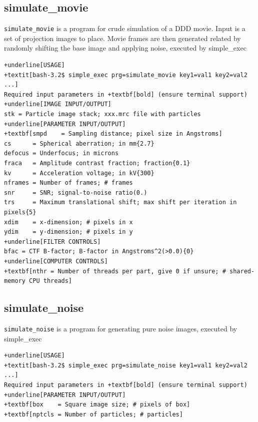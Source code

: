 \documentclass[a4paper,11pt]{article}
\newcommand{\prgname}[1]{\textcolor{NavyBlue}{\texttt{#1}}}
\begin{document}
\subsection{simulate\_movie}
\label{simulate_movie}
\prgname{simulate\_movie} is a program for crude simulation of a DDD movie. Input is a set of projection images to place. Movie frames are then generated related by randomly shifting the base image and applying noise, executed by simple\_exec
\begin{Verbatim}[commandchars=+\[\],fontsize=\small,breaklines=true]
+underline[USAGE]
+textit[bash-3.2$ simple_exec prg=simulate_movie key1=val1 key2=val2 ...]
Required input parameters in +textbf[bold] (ensure terminal support)
+underline[IMAGE INPUT/OUTPUT]
stk = Particle image stack; xxx.mrc file with particles
+underline[PARAMETER INPUT/OUTPUT]
+textbf[smpd    = Sampling distance; pixel size in Angstroms]
cs      = Spherical aberration; in mm{2.7}
defocus = Underfocus; in microns
fraca   = Amplitude contrast fraction; fraction{0.1}
kv      = Acceleration voltage; in kV{300}
nframes = Number of frames; # frames
snr     = SNR; signal-to-noise ratio(0.)
trs     = Maximum translational shift; max shift per iteration in pixels{5}
xdim    = x-dimension; # pixels in x
ydim    = y-dimension; # pixels in y
+underline[FILTER CONTROLS]
bfac = CTF B-factor; B-factor in Angstroms^2(>0.0){0}
+underline[COMPUTER CONTROLS]
+textbf[nthr = Number of threads per part, give 0 if unsure; # shared-memory CPU threads]
\end{Verbatim}

\subsection{simulate\_noise}
\label{simulate_noise}
\prgname{simulate\_noise} is a program for generating pure noise images, executed by simple\_exec
\begin{Verbatim}[commandchars=+\[\],fontsize=\small,breaklines=true]
+underline[USAGE]
+textit[bash-3.2$ simple_exec prg=simulate_noise key1=val1 key2=val2 ...]
Required input parameters in +textbf[bold] (ensure terminal support)
+underline[PARAMETER INPUT/OUTPUT]
+textbf[box    = Square image size; # pixels of box]
+textbf[nptcls = Number of particles; # particles]
\end{Verbatim}
\end{document}
